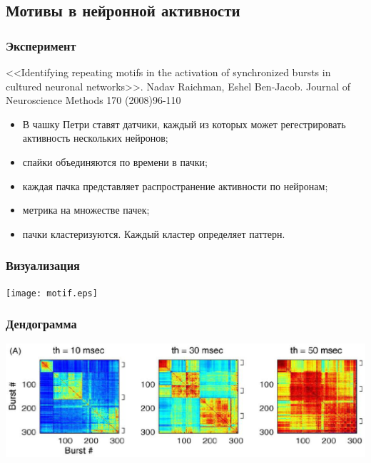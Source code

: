 \documentclass[smaller]{beamer}
\begin{document}
\subsection{Мотивы в нейронной активности}
\begin{frame}
  \frametitle{Эксперимент}
  <<Identifying repeating motifs in the activation of synchronized bursts
 in cultured neuronal networks>>.
 Nadav Raichman, Eshel Ben-Jacob. Journal of Neuroscience Methods 170
 (2008)96-110
  \begin{itemize}
    \item В чашку Петри ставят датчики, каждый из которых может регестрировать активность нескольких нейронов;
    \item спайки объединяются по времени в пачки;
    \item каждая пачка представляет распространение активности по нейронам;
    \item метрика на множестве пачек;
    \item пачки кластеризуются. Каждый кластер определяет паттерн.
  \end{itemize}
\end{frame}

\begin{frame}
  \frametitle{Визуализация}
  \begin{center}
	  \texttt{[image: motif.eps]}
	\end{center}
\end{frame}

\begin{frame}
  \frametitle{Дендограмма}
  \begin{center}
	  \includegraphics[scale=0.25]{motif_dend.eps}
	\end{center}
\end{frame}
\end{document}
